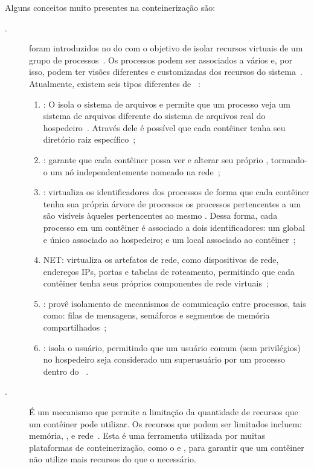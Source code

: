 Alguns conceitos muito presentes na conteinerização são:
\begin{description}
    \item[\namespace.] \Namespaces foram introduzidos no  do \linux com o objetivo de isolar recursos virtuais de um grupo de processos~\cite{gao2017containerleaks}. Os processos podem ser associados a vários \namespaces e, por isso, podem ter visões diferentes e customizadas dos recursos do sistema~\cite{watada2019emerging}. Atualmente, existem seis tipos diferentes de \namespaces~\cite{watada2019emerging}:
    \begin{enumerate}[label=(\roman*)]
        \item \mount: O \mount \namespace isola o sistema de arquivos e permite que um processo veja um sistema de arquivos diferente do sistema de arquivos real do hospedeiro~\cite{watada2019emerging}. Através dele é possível que cada contêiner tenha seu diretório raiz específico~\cite{dua2014virtualization};
        \item \uts: garante que cada contêiner possa ver e alterar seu próprio \hostname, tornando-o um nó independentemente nomeado na rede~\cite{watada2019emerging, dua2014virtualization};
        \item \pid: virtualiza os identificadores dos processos de forma que cada contêiner tenha sua própria árvore de processos \ie os processos pertencentes a um \namespace são visíveis àqueles pertencentes ao mesmo \namespace. Dessa forma, cada processo em um contêiner é associado a dois identificadores: um global e único associado ao hospedeiro; e um local associado ao contêiner~\cite{watada2019emerging};
        \item NET: virtualiza os artefatos de rede, como dispositivos de rede, endereços IPs, portas e tabelas de roteamento, permitindo que cada contêiner tenha seus próprios componentes de rede virtuais~\cite{watada2019emerging, dua2014virtualization};
        \item \ipc: provê isolamento de mecanismos de comunicação entre processos, tais como: filas de mensagens, semáforos e segmentos de memória compartilhados~\cite{watada2019emerging, dua2014virtualization};
        \item \user: isola o usuário, permitindo que um usuário comum (sem privilégios) no hospedeiro seja considerado um superusuário por um processo dentro do \namespace~\cite{watada2019emerging}.
    \end{enumerate}
    \item[\cgroups.] É um mecanismo que permite a limitação da quantidade de recursos que um contêiner pode utilizar. Os recursos que podem ser limitados incluem: memória, \cpu, \io e rede~\cite{watada2019emerging}. Esta é uma ferramenta utilizada por muitas plataformas de conteinerização, como o \docker e \lxc, para garantir que um contêiner não utilize mais recursos do que o necessário.
\end{description}

